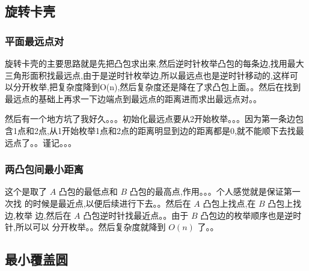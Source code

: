 	\subsection{旋转卡壳}
	\subsubsection{平面最远点对}
	旋转卡壳的主要思路就是先把凸包求出来,然后逆时针枚举凸包的每条边,找用最大
	三角形面积找最远点,由于是逆时针枚举边,所以最远点也是逆时针移动的,这样可
	以分开枚举,把复杂度降到O(n),然后复杂度还是降在了求凸包上面。。然后在找到
	最远点的基础上再求一下边端点到最远点的距离进而求出最远点对。。  
	
	然后有一个地方坑了我好久。。。初始化最远点要从2开始枚举。。。因为第一条边包
	含1点和2点,从1开始枚举1点和2点的距离明显到边的距离都是0,就不能顺下去找最
	远点了。。谨记。。。\\
	
	
	\subsubsection{两凸包间最小距离}
	这个是取了 $A$ 凸包的最低点和 $B$ 凸包的最高点,作用。。。个人感觉就是保证第一次找
	的时候是最近点,以便后续进行下去。。然后在 $A$ 凸包上找点,在 $B$ 凸包上找边,枚举
	边,然后在 $A$ 凸包逆时针找最近点。。由于 $B$ 凸包边的枚举顺序也是逆时针,所以可以
	分开枚举。。然后复杂度就降到 $O(n)$ 了。。\\
	
	\newpage
	\subsection{最小覆盖圆}
	~\\
	
%	
%